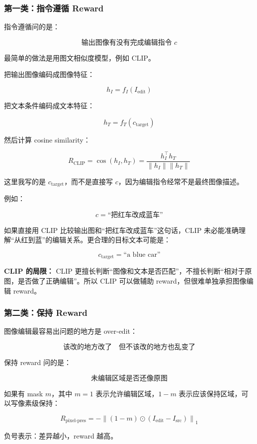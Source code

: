 \subsubsection{第一类：指令遵循 Reward}

指令遵循问的是：

\[
\text{输出图像有没有完成编辑指令 } c
\]

最简单的做法是用图文相似度模型，例如 CLIP。

把输出图像编码成图像特征：

\[
h_I
=
f_I(I_\text{edit})
\]

把文本条件编码成文本特征：

\[
h_T
=
f_T(c_\text{target})
\]

然后计算 cosine similarity：

\[
R_\text{CLIP}
=
\cos(h_I,h_T)
=
\frac{
h_I^\top h_T
}{
\|h_I\|\|h_T\|
}
\]

这里我写的是 $c_\text{target}$，而不是直接写 $c$，因为编辑指令经常不是最终图像描述。

例如：

\[
c=\text{``把红车改成蓝车''}
\]

如果直接用 CLIP 比较输出图和“把红车改成蓝车”这句话，CLIP 未必能准确理解“从红到蓝”的编辑关系。更合理的目标文本可能是：

\[
c_\text{target}=\text{``a blue car''}
\]

\begin{warnbox}
\textbf{CLIP 的局限：} CLIP 更擅长判断“图像和文本是否匹配”，不擅长判断“相对于原图，是否做了正确编辑”。所以 CLIP 可以做辅助 reward，但很难单独承担图像编辑 reward。
\end{warnbox}

\subsubsection{第二类：保持 Reward}

图像编辑最容易出问题的地方是 over-edit：

\[
\text{该改的地方改了}
\quad
\text{但不该改的地方也乱变了}
\]

保持 reward 问的是：

\[
\text{未编辑区域是否还像原图}
\]

如果有 mask $m$，其中 $m=1$ 表示允许编辑区域，$1-m$ 表示应该保持区域，可以写像素级保持：

\[
R_\text{pixel-pres}
=
-
\left\|
(1-m)\odot
\left(
I_\text{edit}-I_\text{src}
\right)
\right\|_1
\]

负号表示：差异越小，reward 越高。

